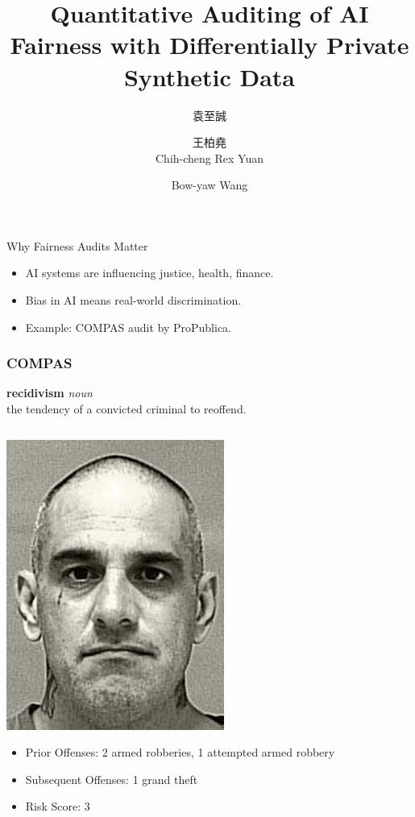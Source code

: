 \documentclass{beamer}
\date{\displaydate{date}}
\title[Fairness]{Quantitative Auditing of AI Fairness with Differentially Private Synthetic Data}
\author[Rex]{
    \begin{CJK}{UTF8}{bsmi}袁至誠\end{CJK} \and \begin{CJK}{UTF8}{bsmi}王柏堯\end{CJK}\newline
    Chih-cheng Rex Yuan \and Bow-yaw Wang
    }
\institute[IIS,AS]{Institute of Information Science, Academia Sinica}
\begin{document}
\begin{frame}
\titlepage
\end{frame}

\begin{frame}{Why Fairness Audits Matter}
  \begin{itemize}
    \item AI systems are influencing justice, health, finance.
    \item Bias in AI means real-world discrimination.
    \item Example: COMPAS audit by ProPublica.
  \end{itemize}
\end{frame}

\begin{frame}
    \frametitle{COMPAS}
    \textbf{recidivism} \textit{noun} \\
    \hspace*{1em} the tendency of a convicted criminal to reoffend.
    \begin{columns}[T]
        \begin{column}{.5\textwidth}
            \centering
            \includegraphics[width=.5\textwidth]{PRATER.jpg}
            \footnotesize
            \begin{itemize}
                \item Prior Offenses: 2 armed robberies, 1 attempted armed robbery
                \item Subsequent Offenses: 1 grand theft
                \item Risk Score: 3
            \end{itemize}
        \end{column}
        \begin{column}{.5\textwidth}

\end{column}
\end{columns}
\end{frame}
\end{document}
